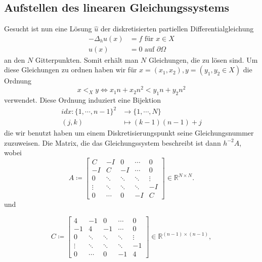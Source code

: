 \documentclass{scrartcl}
\theoremstyle{remark}
\begin{document}
\subsection{Aufstellen des linearen Gleichungssystems}
Gesucht ist nun eine Lösung \(\hat{u}\) der diskretisierten partiellen Differentialgleichung
\begin{align*}
  -\Delta_{h} u(x) &= f \text{       für } x \in X   \\
              u(x) &= 0 \text{       auf } \partial \Omega
\end{align*}
an den \(N\) Gitterpunkten. Somit erhält man \(N\) Gleichungen, die zu lösen sind. Um diese Gleichungen zu ordnen
haben wir für \(x = (x_{1}, x_{2}), y = (y_{1}, y_{2} \in X)\) die Ordnung
\[x <_{X} y \iff x_{1}n + x_{2}n^{2} < y_{1}n + y_{2}n^{2}\]
verwendet. Diese Ordnung induziert eine Bijektion
\begin{align*}
  idx: \{1, \cdots ,n - 1\}^{2} &\longrightarrow \{1, \cdots ,N \} \\ 
                          (j, k)&\longmapsto (k - 1)(n - 1) + j
\end{align*}
die wir benutzt haben um einem Diskretisierungspunkt seine Gleichungsnummer zuzuweisen. Die Matrix, die das Gleichungssystem beschreibt ist dann
\(h^{-2}A\), wobei
\[
  A \coloneq \begin{bmatrix}
  C & -I & 0 & \cdots & 0 \\
  -I & C & -I & \cdots & 0 \\
  0 & \ddots & \ddots & \ddots & \vdots \\
  \vdots & \ddots & \ddots & \ddots & -I \\
  0 & \cdots & 0 & -I & C
  \end{bmatrix}
  \in \mathbb{R}^{N \times N}.
  \]
  und

\[
  C \coloneq \begin{bmatrix}
  4 & -1 & 0 & \cdots & 0 \\
  -1 & 4 & -1 & \cdots & 0 \\
  0 & \ddots & \ddots & \ddots & \vdots \\
  \vdots & \ddots & \ddots & \ddots & -1 \\
  0 & \cdots & 0 & -1 & 4
  \end{bmatrix}
  \in \mathbb{R}^{(n-1) \times (n-1)},
  \] \cite{PPI_Poisson} 
\end{document}
